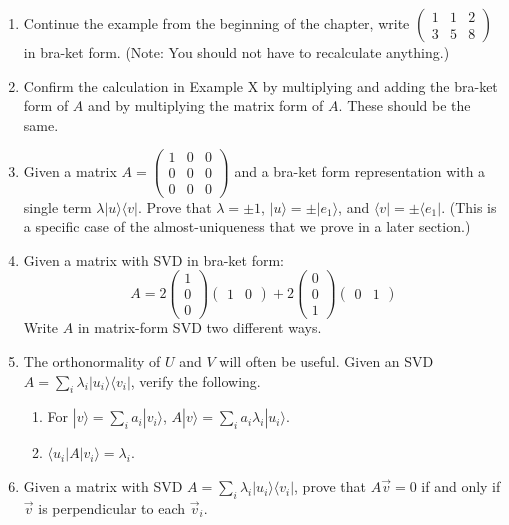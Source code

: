 \documentclass{amsbook}
\begin{document}
\begin{enumerate}
\item Continue the example from the beginning of the chapter, write $\left(
\begin{array}{ccc}
1 & 1 & 2 \\ 3 & 5 & 8
\end{array}
\right)$ in bra-ket form.  (Note: You should not have to recalculate anything.)
\item \label{Ex-Confirm SVD} Confirm the calculation in Example X by multiplying and adding the bra-ket form of $A$ and by multiplying the matrix form of $A$.  These should be the same.
\item Given a matrix $A=\left(\begin{array}{ccc}1&0&0\\0&0&0\\0&0&0\end{array}\right)$ and a bra-ket form representation with a single term $\lambda|u\rangle\langle v|$.  Prove that $\lambda=\pm 1$, $|u\rangle=\pm|e_1\rangle$, and $\langle v|=\pm\langle e_1|$.  (This is a specific case of the almost-uniqueness that we prove in a later section.)
\item \label{Ex-Rectangular bra-ket to matrix} Given a matrix with SVD in bra-ket form:
$$
A=2\left(\begin{array}{c}1\\0\\0\end{array}\right)\left(\begin{array}{cc}1&0\end{array}\right) + 2\left(\begin{array}{c}0\\0\\1\end{array}\right)\left(\begin{array}{cc}0&1\end{array}\right)
$$
Write $A$ in matrix-form SVD two different ways.
\item The orthonormality of $U$ and $V$ will often be useful.  Given an SVD $A=\sum_i\lambda_i|u_i\rangle\langle v_i|$, verify the following.
\begin{enumerate}
\item For $|v\rangle = \sum_ia_i|v_i\rangle$, $A|v\rangle=\sum_ia_i\lambda_i|u_i\rangle$.
\item $\langle u_i|A|v_i\rangle=\lambda_i$.
\end{enumerate}
\item \label{Ex-SVD Null Space} Given a matrix with SVD $A=\sum_i\lambda_i|u_i\rangle\langle v_i|$, prove that $A\vec v=0$ if and only if $\vec v$ is perpendicular to each $\vec v_i$.

\end{enumerate}
\end{document}
